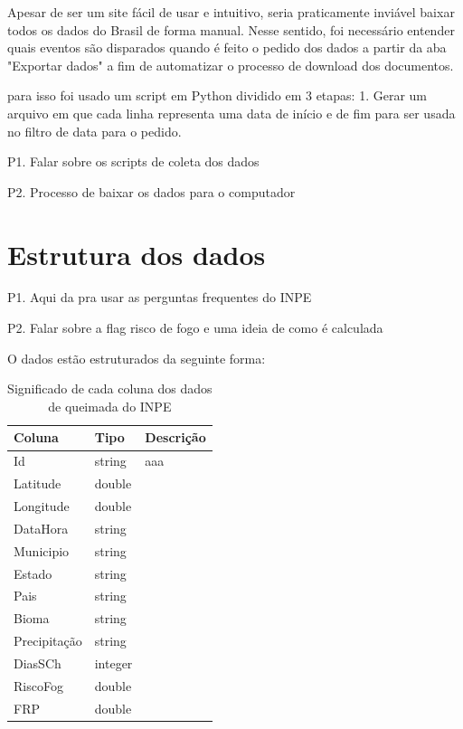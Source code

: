 \documentclass[cic,tc]{iiufrgs}
\begin{document}
Apesar de ser um site fácil de usar e intuitivo, seria praticamente 
inviável baixar todos os dados do Brasil de forma manual. Nesse sentido, 
foi necessário entender quais eventos são disparados quando é feito o 
pedido dos dados a partir da aba "Exportar dados" a fim de automatizar 
o processo de download dos documentos. \par

para isso foi usado um script em Python dividido em 3 etapas:
1. Gerar um arquivo em que cada linha representa uma data de início e de fim
para ser usada no filtro de data para o pedido.



P1. Falar sobre os scripts de coleta dos dados \par
P2. Processo de baixar os dados para o computador \par

\section{Estrutura dos dados}


P1. Aqui da pra usar as perguntas frequentes 
do INPE \citep{PerguntasFrequentesINPE} \par
P2. Falar sobre a flag risco de fogo e uma ideia de como é calculada \par

O dados estão estruturados da seguinte forma: \par

\begin{table}[h!]
\centering
\begin{tabular}{ | l l l | }
\hline
 Coluna & Tipo & Descrição \\
\hline
 Id & string & aaa\\
 Latitude & double & \\ 
 Longitude & double & \\  
 DataHora & string & \\   
 Municipio & string & \\
 Estado & string & \\
 Pais & string & \\  
 Bioma & string & \\
 Precipitação & string & \\
 DiasSCh & integer & \\
 RiscoFog & double & \\
 FRP & double & \\
 \hline
\end{tabular}
\caption{Significado de cada coluna dos dados de queimada do INPE}
\label{table:inpeColumns}
\end{table}
\end{document}
